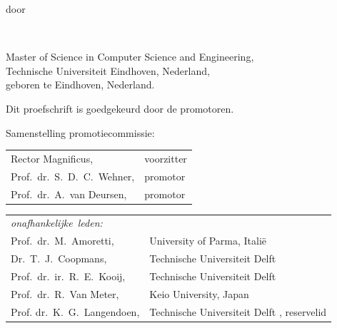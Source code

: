 \begin{titlepage}
\begin{center}
\bigskip
\bigskip

door

\bigskip
\bigskip

\makeatletter
{\Large\titlefont\bfseries\@firstname\ \titleshape{\MakeUppercase{\@lastname}}}
\makeatother

\bigskip
\bigskip

Master of Science in Computer Science and Engineering, \\
Technische Universiteit Eindhoven, Nederland, \\
geboren te Eindhoven, Nederland.

\vspace*{2\bigskipamount}

\end{center}

\clearpage
\thispagestyle{empty}

\noindent
Dit proefschrift is goedgekeurd door de promotoren.

\bigskip\noindent
Samenstelling promotiecommissie:

\medskip\noindent
\begin{tabular}{p{4.5cm}l}
    Rector Magnificus, & voorzitter \\
    Prof.\ dr.\ S.\ D.\ C.\ Wehner, & promotor \\
    Prof.\ dr.\ A.\ van Deursen, & promotor \\
\end{tabular}

\medskip\noindent
\begin{tabular}{p{4.5cm}l}
    \mbox{\emph{onafhankelijke leden:}} & \\
    Prof.\ dr.\ M.\ Amoretti,           & University of Parma, Itali\"e \\
    Dr.\ T.\ J.\ Coopmans,              & Technische Universiteit Delft \\
    Prof.\ dr.\ ir.\ R.\ E.\ Kooij,     & Technische Universiteit Delft \\
    Prof.\ dr.\ R.\ Van Meter,          & Keio University, Japan \\
    Prof. dr.\ K.\ G.\ Langendoen,      & Technische Universiteit Delft , reservelid \\
\end{tabular}


\end{titlepage}
